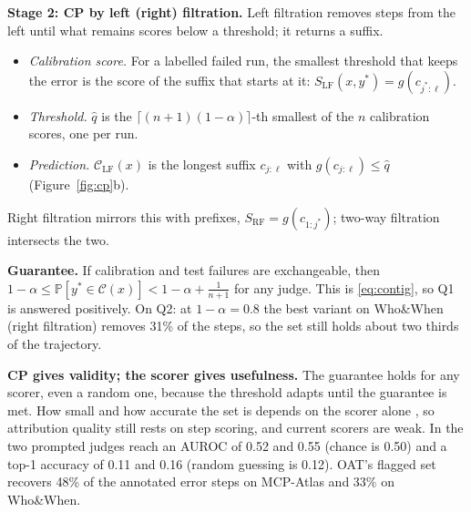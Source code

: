 \documentclass[11pt,a4paper]{article}
\makeatletter
\renewcommand\section{\@startsection{section}{1}{\z@}{6pt plus 2pt minus 1pt}{1.5pt}{\normalsize\bfseries}}
\newcommand{\C}{\mathcal{C}}
\newcommand{\qhat}{\hat q}
\newcommand{\Prob}{\mathbb{P}}
\newcommand{\ystar}{y^{*}}
\newcommand{\jstar}{j^{*}}
\makeatother
\begin{document}
\textbf{Stage 2: CP by left (right) filtration.} Left filtration removes steps from the left until what remains scores below a threshold; it returns a suffix.
\begin{itemize}
\item \emph{Calibration score.} For a labelled failed run, the smallest threshold that keeps the error is the score of the suffix that starts at it: $S_{\mathrm{LF}}(x,\ystar)=g(c_{\jstar:\ell})$.
\item \emph{Threshold.} $\qhat$ is the $\lceil(n+1)(1-\alpha)\rceil$-th smallest of the $n$ calibration scores, one per run.
\item \emph{Prediction.} $\C_{\mathrm{LF}}(x)$ is the longest suffix $c_{j:\ell}$ with $g(c_{j:\ell})\le\qhat$ (Figure~\ref{fig:cp}b).
\end{itemize}
Right filtration mirrors this with prefixes, $S_{\mathrm{RF}}=g(c_{1:\jstar})$; two-way filtration intersects the two.

\textbf{Guarantee.} If calibration and test failures are exchangeable, then $1-\alpha\le\Prob[\ystar\in\C(x)]<1-\alpha+\tfrac{1}{n+1}$ for any judge. This is \eqref{eq:contig}, so Q1 is answered positively. On Q2: at $1-\alpha=0.8$ the best variant on Who\&When (right filtration) removes 31\% of the steps, so the set still holds about two thirds of the trajectory.

\section{Discussion}

\textbf{CP gives validity; the scorer gives usefulness.} The guarantee holds for any scorer, even a random one, because the threshold adapts until the guarantee is met. How small and how accurate the set is depends on the scorer alone \cite{angelopoulos2021gentle}, so attribution quality still rests on step scoring, and current scorers are weak. In \cite{feng2026conformal} the two prompted judges reach an AUROC of 0.52 and 0.55 (chance is 0.50) and a top-1 accuracy of 0.11 and 0.16 (random guessing is 0.12). OAT's flagged set recovers 48\% of the annotated error steps on MCP-Atlas and 33\% on Who\&When.




\end{document}
